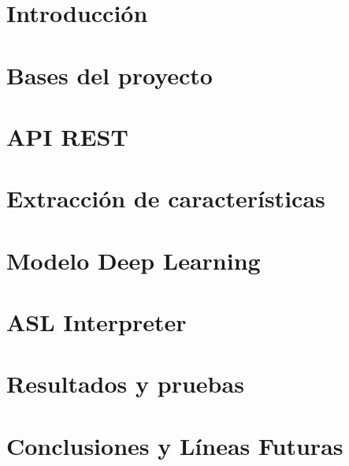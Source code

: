\documentclass[12pt, a4paper, twoside]{article}
\begin{document}


\clearpage
\setcounter{page}{1}






\newpage



\tableofcontents

\section{Introducción}


\section{Bases del proyecto}


\section{API REST}


\section{Extracción de características}


\section{Modelo Deep Learning}


\section{ASL Interpreter}


\section{ Resultados y pruebas}


\section{Conclusiones y Líneas Futuras}

\end{document}
